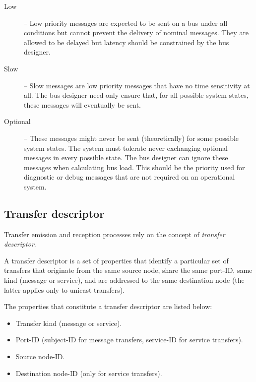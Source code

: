 \begin{remark}[breakable]
\begin{description}
        \item[Low] -- Low priority messages are expected to be sent on a bus under all conditions but cannot
        prevent the delivery of nominal messages.
        They are allowed to be delayed but latency should be constrained by the bus designer.

        \item[Slow] -- Slow messages are low priority messages that have no time sensitivity at all.
        The bus designer need only ensure that, for all possible system states,
        these messages will eventually be sent.

        \item[Optional] -- These messages might never be sent (theoretically) for some possible system states.
        The system must tolerate never exchanging optional messages in every possible state.
        The bus designer can ignore these messages when calculating bus load.
        This should be the priority used for diagnostic or debug messages that are not required on an
        operational system.
    \end{description}
\end{remark}

\subsection{Transfer descriptor}\label{sec:transfer_descriptor}

Transfer emission and reception processes rely on the concept of \emph{transfer descriptor}.

A transfer descriptor is a set of properties that identify a particular set of transfers that originate
from the same source node, share the same port-ID, same kind (message or service), and are addressed to the same
destination node (the latter applies only to unicast transfers).

The properties that constitute a transfer descriptor are listed below:

\begin{itemize}
    \item Transfer kind (message or service).
    \item Port-ID (subject-ID for message transfers, service-ID for service transfers).
    \item Source node-ID.
    \item Destination node-ID (only for service transfers).
\end{itemize}

